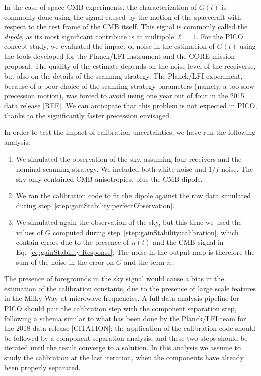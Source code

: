 \documentclass[PICOReport.tex]{subfiles}
\begin{document}
In the case of space CMB experiments, the characterization of $G(t)$ is commonly done using the signal caused by the motion of the spacecraft with respect to the rest frame of the CMB itself. This signal is commonly called the \emph{dipole}, as its most significant contribute is at multipole $\ell=1$. For the PICO concept study, we evaluated the impact of noise in the estimation of $G(t)$ using the tools developed for the Planck/LFI instrument and the CORE mission proposal. The quality of the estimate depends on the noise level of the receiverse, but also on the details of the scanning strategy. The Planck/LFI experiment, because of a poor choice of the scanning strategy parameters (namely, a too slow precession motion), was forced to avoid using one year out of four in the 2015 data release [REF]. We can anticipate that this problem is not expected in PICO, thanks to the significantly faster precession envisaged.

In order to test the impact of calibration uncertainties, we have run the following analysis:
\begin{enumerate}
\item\label{step:gainStability:perfectObservation} We simulated the observation of the sky, assuming four receivers and the nominal scanning strategy. We included both white noise and $1/f$ noise. The sky only contained CMB anisotropies, plus the CMB dipole.
\item\label{step:gainStability:calibration} We ran the calibration code to fit the dipole against the raw data simulated during step~\ref{step:gainStability:perfectObservation}.
\item\label{step:gainStability:imperfectObservation} We simulated again the observation of the sky, but this time we used the values of $G$ computed during step~\ref{step:gainStability:calibration}, which contain errors due to the presence of $n(t)$ and the CMB signal in Eq.~\eqref{eq:gainStability:Response}. The noise in the output map is therefore the sum of the noise in the error on $G$ and the term $n$.
\end{enumerate}
The presence of foregrounds in the sky signal would cause a bias in the estimation of the calibration constants, due to the presence of large scale features in the Milky Way at microwave frequencies. A full data analysis pipeline for PICO should pair the calibration step with the component separation step, following a schema similar to what has been done by the Planck/LFI team for the 2018 data release [CITATION]: the application of the calibration code should be followed by a component separation analysis, and these two steps should be iterated until the result converge to a solution. In this analysis we assume to study the calibration at the last iteration, when the components have already been properly separated.
\end{document}
